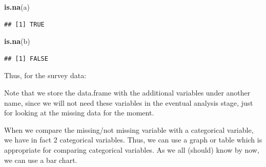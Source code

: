 \documentclass[]{tufte-book}
\newenvironment{Shaded}{}{}
\newcommand{\KeywordTok}[1]{\textcolor[rgb]{0.00,0.44,0.13}{\textbf{#1}}}
\newcommand{\DataTypeTok}[1]{\textcolor[rgb]{0.56,0.13,0.00}{#1}}
\newcommand{\StringTok}[1]{\textcolor[rgb]{0.25,0.44,0.63}{#1}}
\newcommand{\OperatorTok}[1]{\textcolor[rgb]{0.40,0.40,0.40}{#1}}
\newcommand{\NormalTok}[1]{#1}
\begin{document}
\begin{Shaded}
\begin{Highlighting}[]
\KeywordTok{is.na}\NormalTok{(a)}
\end{Highlighting}
\end{Shaded}

\begin{verbatim}
## [1] TRUE
\end{verbatim}

\begin{Shaded}
\begin{Highlighting}[]
\KeywordTok{is.na}\NormalTok{(b)}
\end{Highlighting}
\end{Shaded}

\begin{verbatim}
## [1] FALSE
\end{verbatim}

Thus, for the survey data:

\begin{Shaded}
\end{Shaded}

Note that we store the data.frame with the additional variables under
another name, since we will not need these variables in the eventual
analysis stage, just for looking at the missing data for the moment.

When we compare the missing/not missing variable with a categorical
variable, we have in fact 2 categorical variables. Thus, we can use a
graph or table which is appropriate for comparing categorical variables.
As we all (should) know by now, we can use a bar chart.

\begin{Shaded}
\end{Shaded}
\end{document}
